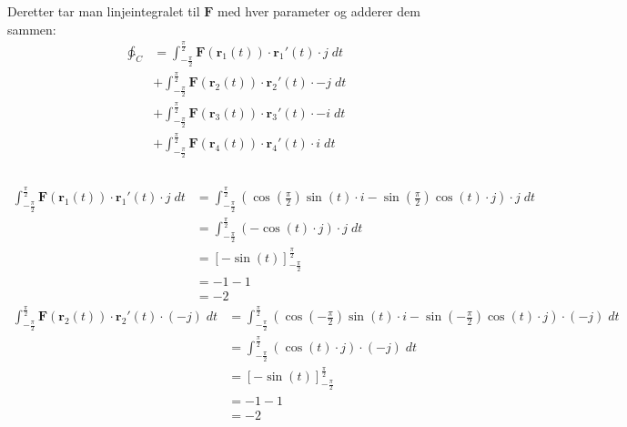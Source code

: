 \documentclass[12pt, a4paper]{article}
\begin{document}
Deretter tar man linjeintegralet til $\textbf{F}$ med hver parameter og adderer dem sammen: \\
\begin{equation}
    \begin{split}
        \ointctrclockwise_C &= \int_{-\frac{\pi}{2}}^{\frac{\pi}{2}} \textbf{F}(\textbf{r}_1(t)) \cdot \textbf{r}_1'(t) \cdot j \; dt \\
                        &+ \int_{-\frac{\pi}{2}}^{\frac{\pi}{2}} \textbf{F}(\textbf{r}_2(t)) \cdot \textbf{r}_2'(t) \cdot -j \; dt \\
                        &+ \int_{-\frac{\pi}{2}}^{\frac{\pi}{2}} \textbf{F}(\textbf{r}_3(t)) \cdot \textbf{r}_3'(t) \cdot -i \; dt \\
                        &+ \int_{-\frac{\pi}{2}}^{\frac{\pi}{2}} \textbf{F}(\textbf{r}_4(t)) \cdot \textbf{r}_4'(t) \cdot i \; dt \\
    \end{split}
\end{equation} \\
\begin{equation}
    \begin{split}
        \int_{-\frac{\pi}{2}}^{\frac{\pi}{2}} \textbf{F}(\textbf{r}_1(t)) \cdot \textbf{r}_1'(t) \cdot j \; dt &= \int_{-\frac{\pi}{2}}^{\frac{\pi}{2}} (\cos\left(\frac{\pi}{2}\right)\sin(t) \cdot i - \sin\left(\frac{\pi}{2}\right)\cos(t) \cdot j) \cdot j \; dt \\
        &= \int_{-\frac{\pi}{2}}^{\frac{\pi}{2}} (- \cos(t) \cdot j) \cdot j \; dt \\
        &= \left[- \sin(t) \right]_{-\frac{\pi}{2}}^{\frac{\pi}{2}} \\
        &= - 1 - 1 \\
        &= -2
    \end{split}
\end{equation}
\begin{equation}
    \begin{split}
        \int_{-\frac{\pi}{2}}^{\frac{\pi}{2}} \textbf{F}(\textbf{r}_2(t)) \cdot \textbf{r}_2'(t) \cdot (-j) \; dt &= \int_{-\frac{\pi}{2}}^{\frac{\pi}{2}} (\cos(-\frac{\pi}{2})\sin(t) \cdot i - \sin(-\frac{\pi}{2})\cos(t) \cdot j) \cdot (-j) \; dt \\
        &= \int_{-\frac{\pi}{2}}^{\frac{\pi}{2}} (\cos(t) \cdot j) \cdot (-j) \; dt \\
        &= \left[- \sin(t) \right]_{-\frac{\pi}{2}}^{\frac{\pi}{2}} \\
        &= - 1 - 1 \\
        &= -2
    \end{split}
\end{equation}
\end{document}
